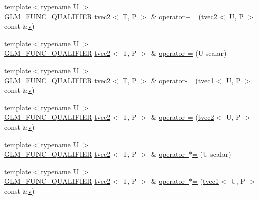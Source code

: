 \begin{DoxyCompactItemize}
\item 
{\footnotesize template$<$typename U $>$ }\\\mbox{\hyperlink{setup_8hpp_a33fdea6f91c5f834105f7415e2a64407}{G\+L\+M\+\_\+\+F\+U\+N\+C\+\_\+\+Q\+U\+A\+L\+I\+F\+I\+ER}} \mbox{\hyperlink{structglm_1_1tvec2}{tvec2}}$<$ T, P $>$ \& \mbox{\hyperlink{structglm_1_1tvec2_aa986a740e1ba345aa71814bb2a08e597}{operator+=}} (\mbox{\hyperlink{structglm_1_1tvec2}{tvec2}}$<$ U, P $>$ const \&\mbox{\hyperlink{glad_8h_a14cfbe2fc2234f5504618905b69d1e06}{v}})
\item 
{\footnotesize template$<$typename U $>$ }\\\mbox{\hyperlink{setup_8hpp_a33fdea6f91c5f834105f7415e2a64407}{G\+L\+M\+\_\+\+F\+U\+N\+C\+\_\+\+Q\+U\+A\+L\+I\+F\+I\+ER}} \mbox{\hyperlink{structglm_1_1tvec2}{tvec2}}$<$ T, P $>$ \& \mbox{\hyperlink{structglm_1_1tvec2_a11ccd30f5d8df13b15d2973eb4428a72}{operator-\/=}} (U scalar)
\item 
{\footnotesize template$<$typename U $>$ }\\\mbox{\hyperlink{setup_8hpp_a33fdea6f91c5f834105f7415e2a64407}{G\+L\+M\+\_\+\+F\+U\+N\+C\+\_\+\+Q\+U\+A\+L\+I\+F\+I\+ER}} \mbox{\hyperlink{structglm_1_1tvec2}{tvec2}}$<$ T, P $>$ \& \mbox{\hyperlink{structglm_1_1tvec2_a9a7beb6222ef80a7f3cf2e9931182445}{operator-\/=}} (\mbox{\hyperlink{structglm_1_1tvec1}{tvec1}}$<$ U, P $>$ const \&\mbox{\hyperlink{glad_8h_a14cfbe2fc2234f5504618905b69d1e06}{v}})
\item 
{\footnotesize template$<$typename U $>$ }\\\mbox{\hyperlink{setup_8hpp_a33fdea6f91c5f834105f7415e2a64407}{G\+L\+M\+\_\+\+F\+U\+N\+C\+\_\+\+Q\+U\+A\+L\+I\+F\+I\+ER}} \mbox{\hyperlink{structglm_1_1tvec2}{tvec2}}$<$ T, P $>$ \& \mbox{\hyperlink{structglm_1_1tvec2_a77a58d01579458e0a09dcbd7a174592c}{operator-\/=}} (\mbox{\hyperlink{structglm_1_1tvec2}{tvec2}}$<$ U, P $>$ const \&\mbox{\hyperlink{glad_8h_a14cfbe2fc2234f5504618905b69d1e06}{v}})
\item 
{\footnotesize template$<$typename U $>$ }\\\mbox{\hyperlink{setup_8hpp_a33fdea6f91c5f834105f7415e2a64407}{G\+L\+M\+\_\+\+F\+U\+N\+C\+\_\+\+Q\+U\+A\+L\+I\+F\+I\+ER}} \mbox{\hyperlink{structglm_1_1tvec2}{tvec2}}$<$ T, P $>$ \& \mbox{\hyperlink{structglm_1_1tvec2_a608b830b0b935e60f1ee4c41939d3de9}{operator $\ast$=}} (U scalar)
\item 
{\footnotesize template$<$typename U $>$ }\\\mbox{\hyperlink{setup_8hpp_a33fdea6f91c5f834105f7415e2a64407}{G\+L\+M\+\_\+\+F\+U\+N\+C\+\_\+\+Q\+U\+A\+L\+I\+F\+I\+ER}} \mbox{\hyperlink{structglm_1_1tvec2}{tvec2}}$<$ T, P $>$ \& \mbox{\hyperlink{structglm_1_1tvec2_a41b653c5ebb130acb642092aeb22d10a}{operator $\ast$=}} (\mbox{\hyperlink{structglm_1_1tvec1}{tvec1}}$<$ U, P $>$ const \&\mbox{\hyperlink{glad_8h_a14cfbe2fc2234f5504618905b69d1e06}{v}})

\end{DoxyCompactItemize}
